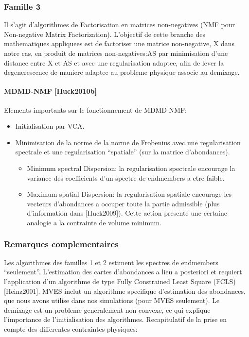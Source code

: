 \subsubsection{Famille 3}
Il s'agit d'algorithmes de Factorisation en matrices non-negatives
(NMF pour Non-negative Matrix Factorization). L'objectif de cette
branche des mathematiques appliquees est de factoriser une matrice
non-negative, X dans notre cas, en produit de matrices
non-negatives:AS par minimisation d'une distance entre X et AS et
avec une regularisation adaptee, afin de lever la degenerescence de
maniere adaptee au probleme physique associe au demixage.
\paragraph{MDMD-NMF [Huck2010b]} 
Elements importants sur le fonctionnement de MDMD-NMF:
\begin{itemize}
\item {Initialisation par VCA.}
\item {Minimisation de la norme de la norme de
Frobenius avec une regularisation spectrale et une regularisation
``spatiale'' (sur la matrice d'abondances).}
\begin{itemize}
\item {Minimum spectral
Dispersion: la regularisation spectrale encourage la variance des
coefficients d'un spectre de endmembers a etre faible.}
\item {Maximum spatial Dispersion: la regularisation spatiale
  encourage les vecteurs d'abondances a occuper toute la partie
  admissible (plus d'information dans [Huck2009]). Cette action
  presente une certaine analogie a la contrainte de volume minimum.}
\end{itemize}
\end{itemize}
 
 
  

\subsubsection{Remarques complementaires}
Les algorithmes des familles 1 et 2 estiment les spectres de
endmembers ``seulement''. L'estimation des cartes d'abondances a lieu
a posteriori et requiert l'application d'un algorithme de type Fully
Constrained Least Square (FCLS) [Heinz2001]. MVES inclut un algorithme
specifique d'estimation des abondances, que nous avons utilise dans
nos simulations (pour MVES seulement).  
Le demixage est un probleme generalement non convexe, ce
qui explique l'importance de l'initialisation des algorithmes.
Recapitulatif de la prise en compte des differentes contraintes
physiques:


